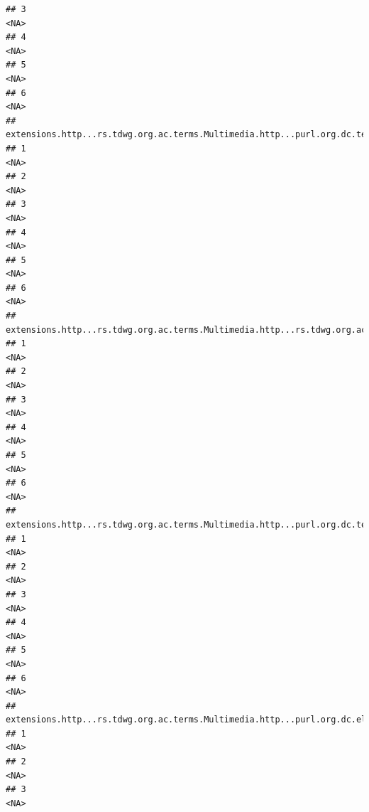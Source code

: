 \documentclass[
]{book}
\begin{document}
\begin{verbatim}
## 3                                                                                  <NA>
## 4                                                                                  <NA>
## 5                                                                                  <NA>
## 6                                                                                  <NA>
##   extensions.http...rs.tdwg.org.ac.terms.Multimedia.http...purl.org.dc.terms.identifier
## 1                                                                                  <NA>
## 2                                                                                  <NA>
## 3                                                                                  <NA>
## 4                                                                                  <NA>
## 5                                                                                  <NA>
## 6                                                                                  <NA>
##   extensions.http...rs.tdwg.org.ac.terms.Multimedia.http...rs.tdwg.org.ac.terms.taxonCoverage
## 1                                                                                        <NA>
## 2                                                                                        <NA>
## 3                                                                                        <NA>
## 4                                                                                        <NA>
## 5                                                                                        <NA>
## 6                                                                                        <NA>
##   extensions.http...rs.tdwg.org.ac.terms.Multimedia.http...purl.org.dc.terms.modified
## 1                                                                                <NA>
## 2                                                                                <NA>
## 3                                                                                <NA>
## 4                                                                                <NA>
## 5                                                                                <NA>
## 6                                                                                <NA>
##   extensions.http...rs.tdwg.org.ac.terms.Multimedia.http...purl.org.dc.elements.1.1.type
## 1                                                                                   <NA>
## 2                                                                                   <NA>
## 3                                                                                   <NA>

\end{verbatim}
\end{document}
